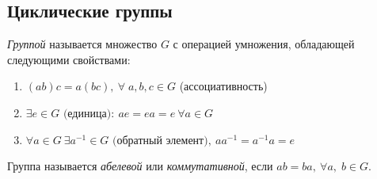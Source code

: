 \subsection*{Циклические группы}
\begin{definition}
  \textit{Группой} называется множество $G$ с операцией умножения, обладающей следующими свойствами:
  \begin{enumerate}
    \item $(ab)c = a(bc),~\forall\;a,b,c \in G$ (ассоциативность)
    \item $\exists e \in G \text{ (единица)}\!:~ ae=ea=e~\forall a \in G$
    \item $\forall a \in G~\exists a^{-1} \in G \text{ (обратный элемент)},~aa^{-1} = a^{-1}a = e$
  \end{enumerate}
\end{definition}
Группа называется \textit{абелевой} или \textit{коммутативной}, если $ab=ba,~\forall a,\;b \in G$.

